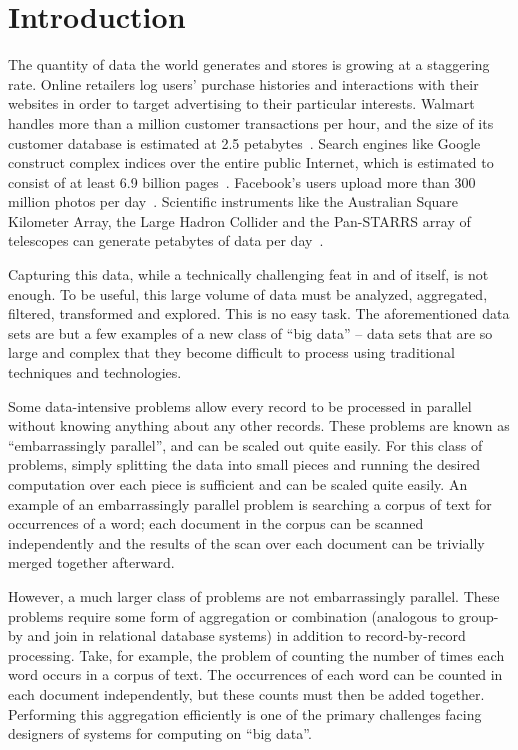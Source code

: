 \chapter{Introduction}
\label{chapter:introduction}

The quantity of data the world generates and stores is growing at a staggering
rate. Online retailers log users' purchase histories and interactions with
their websites in order to target advertising to their particular
interests. Walmart handles more than a million customer transactions per hour,
and the size of its customer database is estimated at 2.5
petabytes~\cite{economist-data-data-everywhere}. Search engines like Google
construct complex indices over the entire public Internet, which is estimated
to consist of at least 6.9 billion pages~\cite{worldwidewebsize}. Facebook's
users upload more than 300 million photos per
day~\cite{jay-parikh-slideshow}. Scientific instruments like the Australian
Square Kilometer Array, the Large Hadron Collider and the Pan-STARRS array of
telescopes can generate petabytes of data per day~\cite{fourth-paradigm}.

Capturing this data, while a technically challenging feat in and of itself, is
not enough. To be useful, this large volume of data must be analyzed,
aggregated, filtered, transformed and explored. This is no easy task. The
aforementioned data sets are but a few examples of a new class of ``big data''
-- data sets that are so large and complex that they become difficult to
process using traditional techniques and technologies.

Some data-intensive problems allow every record to be processed in parallel
without knowing anything about any other records. These problems are known as
``embarrassingly parallel'', and can be scaled out quite easily. For this class
of problems, simply splitting the data into small pieces and running the
desired computation over each piece is sufficient and can be scaled quite
easily. An example of an embarrassingly parallel problem is searching a corpus
of text for occurrences of a word; each document in the corpus can be scanned
independently and the results of the scan over each document can be trivially
merged together afterward.

However, a much larger class of problems are not embarrassingly parallel. These
problems require some form of aggregation or combination (analogous to group-by
and join in relational database systems) in addition to record-by-record
processing. Take, for example, the problem of counting the number of times each
word occurs in a corpus of text. The occurrences of each word can be counted in
each document independently, but these counts must then be added
together. Performing this aggregation efficiently is one of the primary
challenges facing designers of systems for computing on ``big data''.

